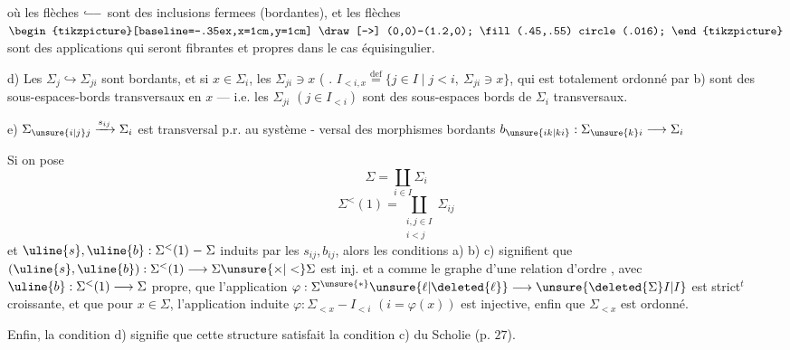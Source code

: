 où les flèches $\lhook\joinrel\relbar\joinrel\relbar$ sont des inclusions
fermees  (bordantes), et les flèches
\(\mathrel{\begin{tikzpicture}[baseline=-.35ex,x=1cm,y=1cm]
\draw[->] (0,0)--(1.2,0);
\fill (.45,.55) circle (.016);
\end{tikzpicture}}\)
sont des applications qui seront fibrantes et propres
dans le cas équisingulier.

d)  Les $\Sigma_j\hookrightarrow\Sigma_{ji}$ sont bordants, et si
$x\in\Sigma_i$,   les $\Sigma_{ji}\ni x$ (
\deleted{$\Sigma$}. $I_{<i,x}\overset{\mathrm{def}}{=}\{j\in I\mid j<i,\ \Sigma_{ji}\ni x\}$,
qui est totalement ordonné par b) sont
des sous-espaces-bords transversaux en $x$
--- i.e. les $\Sigma_{ji}$ $(j\in I_{<i})$ sont des
sous-espaces bords de $\Sigma_i$ 
transversaux.

e) $\Sigma_{\unsure{i|j}j}\xrightarrow{s_{ij}}\Sigma_i$ est transversal p.r. au système -
versal des morphismes bordants
$b_{\unsure{ik|ki}}:\Sigma_{\unsure{k}i}\longrightarrow\Sigma_i$

Si on pose
\[
\Sigma=\coprod_{i\in I}\Sigma_i
\]
\[
\Sigma^{<}(1)=\coprod_{\substack{i,j\in I\\i<j}}\Sigma_{ij}
\]
et $\uline{s},\uline{b}:\Sigma^{<}(1)\mathrel{-}\Sigma$ induits par les
$s_{ij},b_{ij}$, alors les conditions a) b) c)
signifient que $(\uline{s},\uline{b}):\Sigma^{<}(1)\longrightarrow\Sigma\unsure{\times|<}\Sigma$ est
inj. et a comme  le graphe d'une
relation d'ordre , avec $\uline{b}:\Sigma^{<}(1)\longrightarrow\Sigma$
 propre,  que l'application  $\varphi:\Sigma^{\unsure{*}}\unsure{\ell|\deleted{\ell}}\longrightarrow\unsure{\deleted{\Sigma}I|I}$
est strict\({}^t\) croissante, et que pour  $x\in\Sigma$,
l'application induite $\varphi:\Sigma_{<x}\mathrel{-}I_{<i}$ $(i=\varphi(x))$ est
injective, enfin que $\Sigma_{<x}$ est  ordonné.

Enfin, la condition d) signifie que cette structure
satisfait la condition c) du Scholie (p. $27$).

